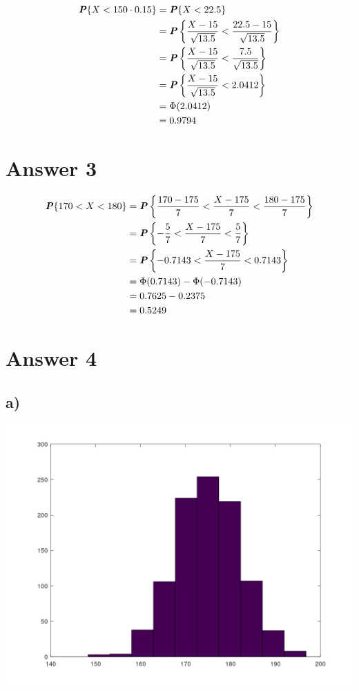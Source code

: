 \documentclass[12pt]{article}
\newcommand{\boldP}{\textbf{\textit{P}}}
\begin{document}
\vspace{-5mm}
\begin{align*}
  \boldP\{X < 150 \cdot 0.15\}
    &= \boldP\{X < 22.5\} \\
    &= \boldP \left\{ \frac{X - 15}{\sqrt{13.5}}
                    < \frac{22.5 - 15}{\sqrt{13.5}} \right\} \\
    &= \boldP \left\{ \frac{X - 15}{\sqrt{13.5}}
                    < \frac{7.5}{\sqrt{13.5}} \right\} \\
    &= \boldP \left\{ \frac{X - 15}{\sqrt{13.5}} < 2.0412 \right\} \\
    &= \Phi(2.0412) \\
    &= 0.9794
\end{align*}

\newpage

\section*{Answer 3}

\begin{align*}
  \boldP\{170 < X < 180\}
    &= \boldP \left\{ \frac{170 - 175}{7}
                    < \frac{X - 175}{7} < \frac{180 - 175}{7} \right\} \\
    &= \boldP \left\{ -\frac{5}{7} < \frac{X - 175}{7} < \frac{5}{7} \right\} \\
    &= \boldP \left\{ -0.7143 < \frac{X - 175}{7} < 0.7143 \right\} \\
    &= \Phi(0.7143) - \Phi(-0.7143) \\
    &= 0.7625 - 0.2375 \\
    &= 0.5249
\end{align*}

\section*{Answer 4}

\subsection*{a)}

\includegraphics[width=\textwidth]{the2_hist.png}
\end{document}
